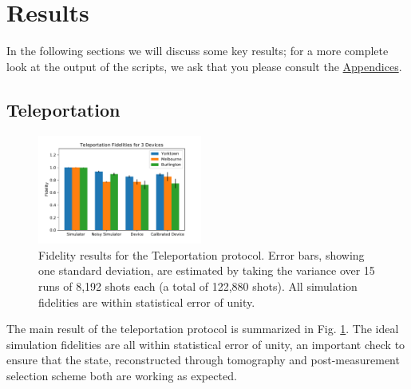 \section{Results}

In the following sections we will discuss some key results;
for a more complete look at the output of the scripts, we ask that you please
consult the \hyperref[apen]{Appendices}.

\subsection{Teleportation}

\begin{figure}[h!] \centering \includegraphics[width=0.48\textwidth]{images/results/teleport_histogram.pdf}
	\caption{Fidelity results for the Teleportation protocol. Error bars, showing
    one standard deviation, are estimated by taking the variance over 15 runs of
    8,192 shots each (a total of 122,880 shots). All simulation fidelities are
    within statistical error of unity.}
	\label{fig:teleport_histogram}
\end{figure}

The main result of the teleportation protocol is summarized in Fig.
\ref{fig:teleport_histogram}. The ideal simulation fidelities are all within
statistical error of unity, an important check to ensure that the state,
reconstructed through tomography and post-measurement selection scheme both are
working as expected.

